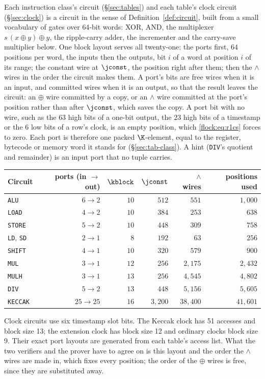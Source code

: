 Each instruction class's circuit (\S\ref{sec:tables}) and each table's clock circuit (\S\ref{sec:clock}) is a circuit in the sense of Definition~\ref{def:circuit}, built from a small vocabulary of gates over $64$-bit words: XOR, AND, the multiplexer $s\,(x\oplus y)\oplus y$, the ripple-carry adder, the incrementer and the carry-save multiplier below. One block layout serves all twenty-one: the ports first, $64$ positions per word, the inputs then the outputs, bit $i$ of a word at position $i$ of its range; the constant wire at $\jconst$, the position right after them; then the $\wedge$ wires in the order the circuit makes them. A port's bits are free wires when it is an input, and committed wires when it is an output, so that the result leaves the circuit: an $\oplus$ wire committed by a copy, or an $\wedge$ wire committed at the port's position rather than after $\jconst$, which saves the copy. A port bit with no wire, such as the $63$ high bits of a one-bit output, the $23$ high bits of a timestamp or the $6$ low bits of a row's clock, is an empty position, which \eqref{flock:eq:r1cs} forces to zero. Each port is therefore one packed $\K$-element, equal to the register, bytecode or memory word it stands for (\S\ref{sec:tab-class}). A hint (\texttt{DIV}'s quotient and remainder) is an input port that no tuple carries.
\begin{center}
\begin{tabular}{lrrrrr}
\hline
Circuit & ports (in $\to$ out) & $\kblock$ & $\jconst$ & $\wedge$ wires & positions used\\
\hline
\texttt{ALU}   & $6\to2$  & $10$ & $512$   & $551$      & $1{,}000$\\
\texttt{LOAD}  & $4\to2$  & $10$ & $384$   & $253$      & $638$\\
\texttt{STORE} & $5\to2$  & $10$ & $448$   & $309$      & $758$\\
\texttt{LD}, \texttt{SD} & $2\to1$ & $8$ & $192$ & $63$ & $256$\\
\texttt{SHIFT} & $4\to1$  & $10$ & $320$   & $579$      & $900$\\
\texttt{MUL}   & $3\to1$  & $12$ & $256$   & $2{,}175$  & $2{,}432$\\
\texttt{MULH}  & $3\to1$  & $13$ & $256$   & $4{,}545$  & $4{,}802$\\
\texttt{DIV}   & $5\to2$  & $13$ & $448$   & $5{,}156$  & $5{,}605$\\
\texttt{KECCAK} & $25\to25$ & $16$ & $3{,}200$ & $38{,}400$ & $41{,}601$\\
\hline
\hline
\end{tabular}
\end{center}
Clock circuits use six timestamp slot bits. The Keccak clock has 51 accesses and block size 13; the extension clock has block size 12 and ordinary clocks block size 9. Their exact port layouts are generated from each table's access list. What the two verifiers and the prover have to agree on is this layout and the order the $\wedge$ wires are made in, which fixes every position; the order of the $\oplus$ wires is free, since they are substituted away.

